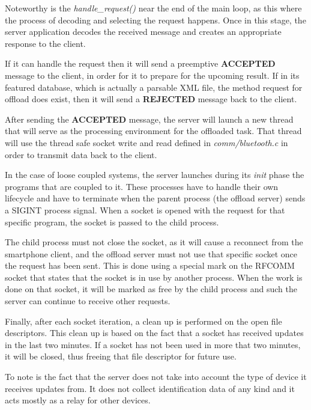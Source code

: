 Noteworthy is the \textit{handle_request()} near the end of the main loop, as this where the process of decoding and selecting the request happens. Once in this stage, the server application decodes the received message and creates an appropriate response to the client.

If it can handle the request then it will send a preemptive \textbf{ACCEPTED} message to the client, in order for it to prepare for the upcoming result. If in its featured database, which is actually a parsable XML file, the method request for offload does exist, then it will send a \textbf{REJECTED} message back to the client.

After sending the \textbf{ACCEPTED} message, the server will launch a new thread that will serve as the processing environment for the offloaded task. That thread will use the thread safe socket write and read defined in \textit{comm/bluetooth.c} in order to transmit data back to the client.

In the case of loose coupled systems, the server launches during its \textit{init} phase the programs that are coupled to it. These processes have to handle their own lifecycle and have to terminate when the parent process (the offload server) sends a SIGINT process signal. When a socket is opened with the request for that specific program, the socket is passed to the child process. 

The child process must not close the socket, as it will cause a reconnect from the smartphone client, and the offload server must not use that specific socket once the request has been sent. This is done using a special mark on the RFCOMM socket that states that the socket is in use by another process. When the work is done on that socket, it will be marked as free by the child process and such the server can continue to receive other requests.

Finally, after each socket iteration, a clean up is performed on the open file descriptors. This clean up is based on the fact that a socket has received updates in the last two minutes. If a socket has not been used in more that two minutes, it will be closed, thus freeing that file descriptor for future use.

To note is the fact that the server does not take into account the type of device it receives updates from. It does not collect identification data of any kind and it acts mostly as a relay for other devices.






